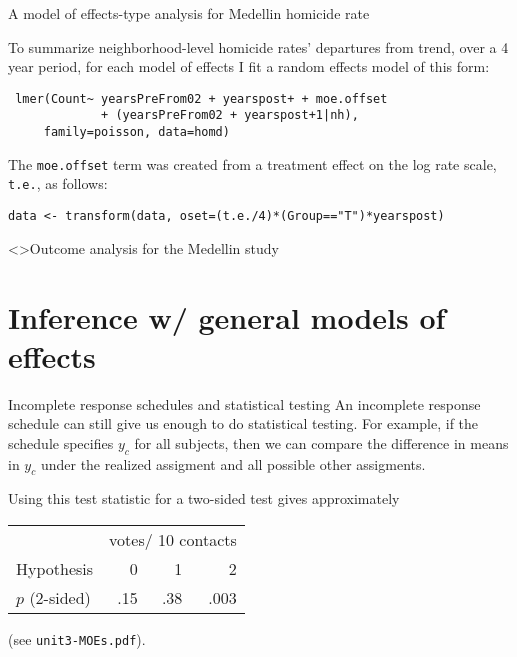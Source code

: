 \begin{frame}[fragile]{A model of effects-type analysis for Medellin homicide rate}

To summarize neighborhood-level homicide rates' departures from 
 trend, over a 4 year period, for each model of effects I fit a random
 effects model of this form:

\begin{verbatim}
 lmer(Count~ yearsPreFrom02 + yearspost+ + moe.offset
             + (yearsPreFrom02 + yearspost+1|nh),
     family=poisson, data=homd)
\end{verbatim}

The \texttt{moe.offset} term was created from a treatment effect on
the log rate scale, \texttt{t.e.}, as follows:
\begin{verbatim}
data <- transform(data, oset=(t.e./4)*(Group=="T")*yearspost)
\end{verbatim}
  
\end{frame}

\begin{frame}<\nottheirhandout>{Outcome analysis for the Medellin study}
  
  \begin{center}
  \end{center}

\end{frame}


\section{Inference w/ general models of effects}
\begin{frame}{Incomplete response schedules and statistical testing}
   An incomplete response schedule can still give us enough to do statistical testing. For example, if the schedule specifies $y_c$ for all subjects, then we can compare the difference in means in $y_c$ under the realized assigment and all possible other assigments.  

Using this test statistic for a two-sided test gives approximately

\begin{center}
\begin{tabular}{l|rrr} \hline
& \multicolumn{3}{c}{votes/ 10 contacts}\\ 
  Hypothesis & 0 & 1 & 2 \\ \hline
$p$ (2-sided) & .15 & .38 & .003 \\ \hline 
\end{tabular}
\end{center}

(see \texttt{unit3-MOEs.pdf}).
\end{frame}

